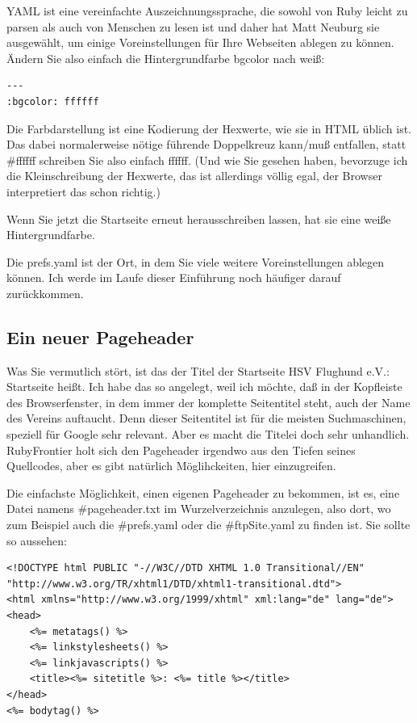 \documentclass[11pt]{report}
\begin{document}
YAML ist eine vereinfachte Auszeichnungssprache, die sowohl von Ruby
leicht zu parsen als auch von Menschen zu lesen ist und daher hat Matt
Neuburg sie ausgewählt, um einige Voreinstellungen für Ihre Webseiten
ablegen zu können. Ändern Sie also einfach die Hintergrundfarbe
bgcolor nach weiß:


\begin{verbatim}
---
:bgcolor: ffffff
\end{verbatim}

Die Farbdarstellung ist eine Kodierung der Hexwerte, wie sie in HTML
üblich ist. Das dabei normalerweise nötige führende Doppelkreuz
kann/muß entfallen, statt \#ffffff schreiben Sie also einfach
ffffff. (Und wie Sie gesehen haben, bevorzuge ich die Kleinschreibung
der Hexwerte, das ist allerdings völlig egal, der Browser
interpretiert das schon richtig.)

Wenn Sie jetzt die Startseite erneut herausschreiben lassen, hat sie
eine weiße Hintergrundfarbe.

Die prefs.yaml ist der Ort, in dem Sie viele weitere Voreinstellungen
ablegen können. Ich werde im Laufe dieser Einführung noch häufiger
darauf zurückkommen.
\subsection{Ein neuer Pageheader}
\label{sec-2-1-1-1}


Was Sie vermutlich stört, ist das der Titel der Startseite HSV Flughund e.V.: Startseite heißt. Ich habe das so angelegt, weil ich möchte, daß in der Kopfleiste des Browserfenster, in dem immer der komplette Seitentitel steht, auch der Name des Vereins auftaucht. Denn dieser Seitentitel ist für die meisten Suchmaschinen, speziell für Google sehr relevant. Aber es macht die Titelei doch sehr unhandlich. RubyFrontier holt sich den Pageheader irgendwo aus den Tiefen seines Quellcodes, aber es gibt natürlich Möglihckeiten, hier einzugreifen.

Die einfachste Möglichkeit, einen eigenen Pageheader zu bekommen, ist es, eine Datei namens \#pageheader.txt im Wurzelverzeichnis anzulegen, also dort, wo zum Beispiel auch die \#prefs.yaml oder die \#ftpSite.yaml zu finden ist. Sie sollte so aussehen:


\begin{verbatim}
<!DOCTYPE html PUBLIC "-//W3C//DTD XHTML 1.0 Transitional//EN"
"http://www.w3.org/TR/xhtml1/DTD/xhtml1-transitional.dtd">
<html xmlns="http://www.w3.org/1999/xhtml" xml:lang="de" lang="de">
<head>
    <%= metatags() %>
    <%= linkstylesheets() %>
    <%= linkjavascripts() %>
    <title><%= sitetitle %>: <%= title %></title>
</head>
<%= bodytag() %>
\end{verbatim}
\end{document}
